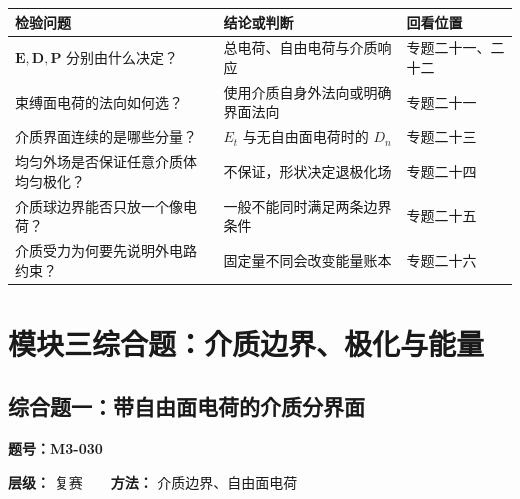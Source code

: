 {\def\LTcaptype{none} %
\begin{longtable}[]{@{}
  >{\raggedright\arraybackslash}p{}
  >{\raggedright\arraybackslash}p{}
  >{\raggedright\arraybackslash}p{}@{}}
\toprule\noalign{}
\begin{minipage}[b]{\linewidth}\raggedright
检验问题
\end{minipage} & \begin{minipage}[b]{\linewidth}\raggedright
结论或判断
\end{minipage} & \begin{minipage}[b]{\linewidth}\raggedright
回看位置
\end{minipage} \\
\midrule\noalign{}
\endhead
\bottomrule\noalign{}
\endlastfoot
\(\mathbf E,\mathbf D,\mathbf P\) 分别由什么决定？ &
总电荷、自由电荷与介质响应 & 专题二十一、二十二 \\
束缚面电荷的法向如何选？ & 使用介质自身外法向或明确界面法向 &
专题二十一 \\
介质界面连续的是哪些分量？ & \(E_t\) 与无自由面电荷时的 \(D_n\) &
专题二十三 \\
均匀外场是否保证任意介质体均匀极化？ & 不保证，形状决定退极化场 &
专题二十四 \\
介质球边界能否只放一个像电荷？ & 一般不能同时满足两条边界条件 &
专题二十五 \\
介质受力为何要先说明外电路约束？ & 固定量不同会改变能量账本 &
专题二十六 \\
\end{longtable}
}

\section{模块三综合题：介质边界、极化与能量}\label{m3:ux6a21ux5757ux4e09ux7efcux5408ux9898ux4ecbux8d28ux8fb9ux754cux6781ux5316ux4e0eux80fdux91cf}

\subsection{综合题一：带自由面电荷的介质分界面}\label{m3:ux7efcux5408ux9898ux4e00ux5e26ux81eaux7531ux9762ux7535ux8377ux7684ux4ecbux8d28ux5206ux754cux9762}

\textbf{题号：M3-030}

\textbf{层级：} 复赛　　\textbf{方法：} 介质边界、自由面电荷

